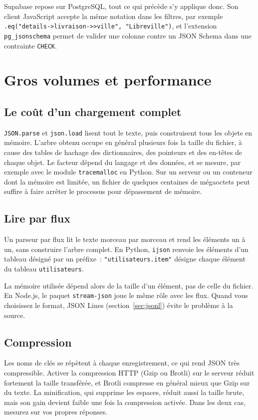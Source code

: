 \documentclass[12pt,a4paper]{article}
\newcommand{\exemple}[3][]{%
  \par\addvspace{6pt}\noindent\begin{minipage}{\linewidth}%
  \end{minipage}\par\addvspace{6pt}}
\begin{document}
Supabase repose sur PostgreSQL, tout ce qui précède s'y applique donc. Son client JavaScript accepte la même notation dans les filtres, par exemple \nolinkurl{.eq("details->livraison->>ville", "Libreville")}, et l'extension \texttt{pg\_jsonschema} permet de valider une colonne contre un JSON Schema dans une contrainte \texttt{CHECK}.

\section{Gros volumes et performance}
\label{sec:perf}

\subsection{Le coût d'un chargement complet}
\texttt{JSON.parse} et \texttt{json.load} lisent tout le texte, puis construisent tous les objets en mémoire. L'arbre obtenu occupe en général plusieurs fois la taille du fichier, à cause des tables de hachage des dictionnaires, des pointeurs et des en-têtes de chaque objet. Le facteur dépend du langage et des données, et se mesure, par exemple avec le module \texttt{tracemalloc} en Python. Sur un serveur ou un conteneur dont la mémoire est limitée, un fichier de quelques centaines de mégaoctets peut suffire à faire arrêter le processus pour dépassement de mémoire.

\subsection{Lire par flux}
Un parseur par flux lit le texte morceau par morceau et rend les éléments un à un, sans construire l'arbre complet. En Python, \texttt{ijson} renvoie les éléments d'un tableau désigné par un préfixe~: \texttt{"utilisateurs.item"} désigne chaque élément du tableau \texttt{utilisateurs}.

\exemple[language=python]{python/07_ijson.py}{Compter des éléments sans charger tout le fichier}

La mémoire utilisée dépend alors de la taille d'un élément, pas de celle du fichier. En Node.js, le paquet \texttt{stream-json} joue le même rôle avec les flux. Quand vous choisissez le format, JSON Lines (section~\ref{sec:jsonl}) évite le problème à la source.

\subsection{Compression}
Les noms de clés se répètent à chaque enregistrement, ce qui rend JSON très compressible. Activer la compression HTTP (Gzip ou Brotli) sur le serveur réduit fortement la taille transférée, et Brotli compresse en général mieux que Gzip sur du texte. La minification, qui supprime les espaces, réduit aussi la taille brute, mais son gain devient faible une fois la compression activée. Dans les deux cas, mesurez sur vos propres réponses.
\end{document}
